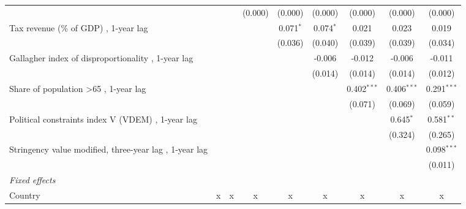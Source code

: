 \begin{table}[htbp]
\begin{tabular}{lcccccccc}
                                                              &         &         & (0.000)       & (0.000)       & (0.000)      & (0.000)       & (0.000)       & (0.000)\\   
      Tax revenue (\% of GDP) , 1-year lag                    &         &         &               & 0.071$^{*}$   & 0.074$^{*}$  & 0.021         & 0.023         & 0.019\\   
                                                              &         &         &               & (0.036)       & (0.040)      & (0.039)       & (0.039)       & (0.034)\\   
      Gallagher index of disproportionality , 1-year lag      &         &         &               &               & -0.006       & -0.012        & -0.006        & -0.011\\   
                                                              &         &         &               &               & (0.014)      & (0.014)       & (0.014)       & (0.012)\\   
      Share of population >65 , 1-year lag                    &         &         &               &               &              & 0.402$^{***}$ & 0.406$^{***}$ & 0.291$^{***}$\\   
                                                              &         &         &               &               &              & (0.071)       & (0.069)       & (0.059)\\   
      Political constraints index V (VDEM) , 1-year lag       &         &         &               &               &              &               & 0.645$^{*}$   & 0.581$^{**}$\\   
                                                              &         &         &               &               &              &               & (0.324)       & (0.265)\\   
      Stringency value modified, three-year lag , 1-year lag  &         &         &               &               &              &               &               & 0.098$^{***}$\\   
                                                              &         &         &               &               &              &               &               & (0.011)\\   
      \emph{Fixed effects}\\
      Country                                                 & x       & x       & x             & x             & x            & x             & x             & x\\  

\end{tabular}
\end{table}
